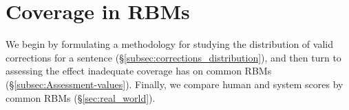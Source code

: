 \documentclass[11pt, a4paper]{article}
\begin{document}
%
%
%
%
%
%
%

\section{Coverage in RBMs}\label{sec:increase-reference}

We begin by formulating a methodology for studying the distribution of valid 
corrections for a sentence (\S\ref{subsec:corrections_distribution}), 
and then turn to assessing the effect inadequate 
coverage has on common RBMs (\S\ref{subsec:Assessment-values}). 
Finally, we compare human and system scores by common RBMs (\S\ref{sec:real_world}).

\end{document}
